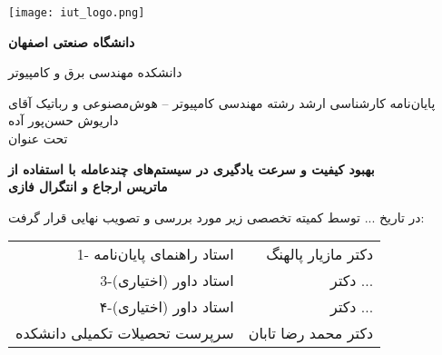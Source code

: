 \thispagestyle{empty}
\begin{center}
\texttt{[image: iut\_logo.png]}
\vspace{0.4cm}

\textbf{دانشگاه صنعتی اصفهان}\\
\vspace{0.4cm}

{\large
	دانشکده مهندسی برق و کامپیوتر
}
\vspace{1.8cm}

\vfill

{\Large
	پایان‌نامه کارشناسی ارشد رشته مهندسی کامپیوتر -- هوش‌مصنوعی و رباتیک آقای داریوش حسن‌پور آده\\
	\vspace{.3cm}
	تحت عنوان\\
}


\end{center}

\begin{center}
{\large
	\textbf{بهبود کیفیت و سرعت یادگیری در سیستم‌های چندعامله با استفاده از\\
	ماتریس ارجاع و انتگرال فازی}
}
\end{center}
\vspace*{1.8cm}
در تاریخ ... توسط کمیته تخصصی زیر مورد بررسی و تصویب نهایی قرار گرفت:\\

{\normalsize
	
	\begin{tabular}{rr}
	\vspace*{.8cm}
	1- استاد راهنمای پایان‌نامه  & \hspace{2cm} دکتر مازیار پالهنگ \\
	\vspace{.8cm}
	3-استاد داور (اختیاری) &\hspace{2cm} دکتر ... \\
	\vspace{.8cm}
	۴-استاد داور (اختیاری) &\hspace{2cm} دکتر ... \\
	\vspace{.8cm}
	سرپرست تحصیلات تکمیلی دانشکده &\hspace{2cm} دکتر محمد رضا تابان \\
	\end{tabular}
}
\restoregeometry
\pagebreak

\thispagestyle{empty}
\vspace*{1.5cm}

